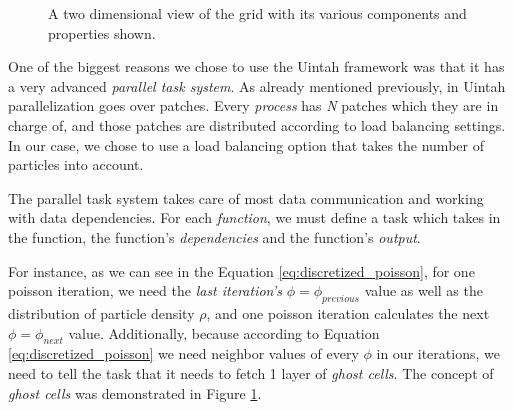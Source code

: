 \documentclass[notitlepage, 12pt]{article}
\begin{document}
\begin{figure}[H]
\centering
{}
\caption{A two dimensional view of the grid with its various components and properties shown.}
\label{fig:grid}
\end{figure}

One of the biggest reasons we chose to use the Uintah framework was that it has a very advanced \emph{parallel task system}. As already mentioned 
previously, in Uintah parallelization goes over patches. Every \emph{process} has \emph{N} patches which they are in charge of, and those patches 
are distributed according to load balancing settings. In our case, we chose to use a load balancing option that takes the number of particles into account. 

The parallel task system takes care of most data communication and working with data dependencies. For each \emph{function}, we must define a task which 
takes in the function, the function's \emph{dependencies} and the function's \emph{output}.

For instance, as we can see in the Equation 
\ref{eq:discretized_poisson}, for one poisson iteration, we need the \emph{last iteration's} $\phi=\phi_{previous}$ value as well as the distribution of 
particle density $\rho$, and one poisson iteration calculates the next $\phi=\phi_{next}$ value. Additionally, because according to Equation \ref{eq:discretized_poisson} 
we need neighbor values of every $\phi$ in our iterations, we need to tell the task that it needs to fetch 1 layer of \emph{ghost cells}. The concept of 
\emph{ghost cells} was demonstrated in Figure \ref{fig:grid}.
\end{document}
